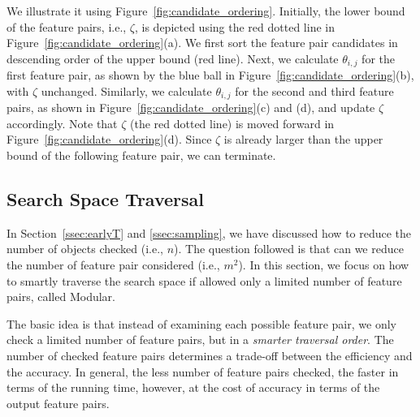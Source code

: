 \begin{example}
We illustrate it using Figure~\ref{fig:candidate_ordering}. Initially, the lower bound of the \topthree feature pairs, i.e., $\zeta$, is depicted using the red dotted line  in Figure~\ref{fig:candidate_ordering}(a). We first sort the feature pair candidates in descending order of the upper bound (red line). Next, we calculate $\theta_{i,j}$ for the first feature pair, as shown by the blue ball in Figure~\ref{fig:candidate_ordering}(b), with $\zeta$ unchanged. Similarly, we calculate $\theta_{i,j}$ for the second and third feature pairs, as shown in Figure~\ref{fig:candidate_ordering}(c) and (d), and update $\zeta$ accordingly. Note that $\zeta$ (the red dotted line) is moved forward in Figure~\ref{fig:candidate_ordering}(d). Since $\zeta$ is already larger than the upper bound of the following feature pair, we can terminate.
\end{example}

\subsection{Search Space Traversal} \label{ssec:traversal}
In Section~\ref{ssec:earlyT} and \ref{ssec:sampling}, we have discussed how to reduce the number of objects checked (i.e., $n$). The question followed is that can we reduce the number of feature pair considered (i.e., $m^2$). In this section, we focus on how to smartly traverse the search space if allowed only a limited number of feature pairs, called \traversal Modular. 

  The basic idea is that instead of examining each possible feature pair, we only check a limited number of feature pairs, but in a {\em smarter traversal order}. The number of checked feature pairs determines a trade-off between the efficiency and the accuracy. In general, the less number of feature pairs checked, the faster in terms of the running time, however, at the cost of accuracy in terms of the output \topk feature pairs.

